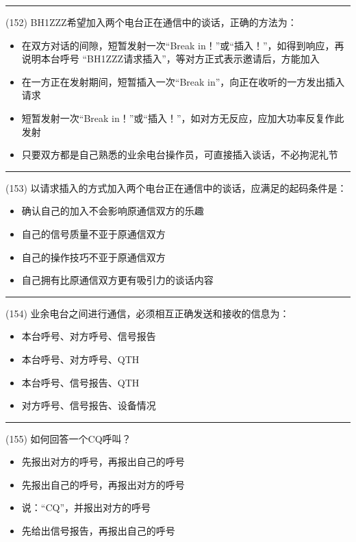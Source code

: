 \documentclass[twocolumn,hyperref,UTF8]{ctexart}  %
\begin{document}
\noindent\rule{0.5\textwidth}{1pt}
\heiti (152) BH1ZZZ希望加入两个电台正在通信中的谈话，正确的方法为： \songti {\color{gray} [LK0244] }
\begin{itemize}
	\item  在双方对话的间隙，短暂发射一次“Break in！”或“插入！”，如得到响应，再说明本台呼号 “BH1ZZZ请求插入”，等对方正式表示邀请后，方能加入
	\item  在一方正在发射期间，短暂插入一次“Break in”，向正在收听的一方发出插入请求
	\item  短暂发射一次“Break in！”或“插入！”，如对方无反应，应加大功率反复作此发射
	\item  只要双方都是自己熟悉的业余电台操作员，可直接插入谈话，不必拘泥礼节
\end{itemize}


\noindent\rule{0.5\textwidth}{1pt}
\heiti (153) 以请求插入的方式加入两个电台正在通信中的谈话，应满足的起码条件是： \songti {\color{gray} [LK0245] }
\begin{itemize}
	\item  确认自己的加入不会影响原通信双方的乐趣
	\item  自己的信号质量不亚于原通信双方
	\item  自己的操作技巧不亚于原通信双方
	\item  自己拥有比原通信双方更有吸引力的谈话内容
\end{itemize}


\noindent\rule{0.5\textwidth}{1pt}
\heiti (154) 业余电台之间进行通信，必须相互正确发送和接收的信息为： \songti {\color{gray} [LK1046] }
\begin{itemize}
	\item  本台呼号、对方呼号、信号报告
	\item  本台呼号、对方呼号、QTH
	\item  本台呼号、信号报告、QTH
	\item  对方呼号、信号报告、设备情况
\end{itemize}


\noindent\rule{0.5\textwidth}{1pt}
\heiti (155) 如何回答一个CQ呼叫？ \songti {\color{gray} [LK1097] }
\begin{itemize}
	\item  先报出对方的呼号，再报出自己的呼号
	\item  先报出自己的呼号，再报出对方的呼号
	\item  说：“CQ”，并报出对方的呼号
	\item  先给出信号报告，再报出自己的呼号
\end{itemize}
\end{document}
